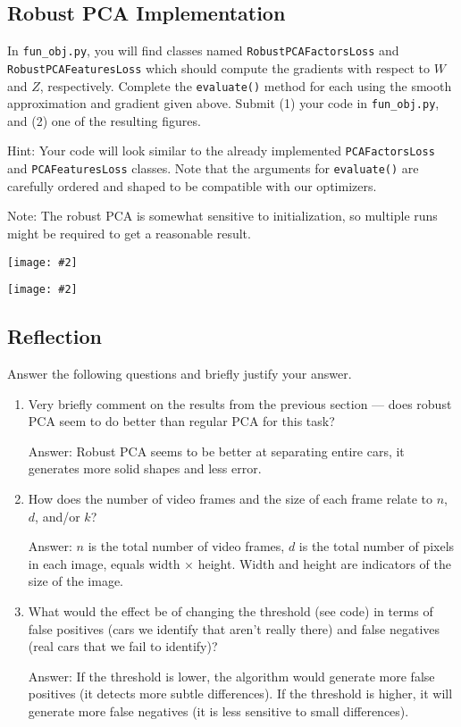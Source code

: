 \documentclass{article}
\newcommand{\blu}[1]{{\textcolor{blu}{#1}}}
\newcommand{\gre}[1]{\textcolor{gre}{#1}}
\newcommand\ans[1]{\par\gre{Answer: #1}}
\let\ask\blu
\newcommand{\centerfig}[2]{\begin{center}\texttt{[image: \#2]}\end{center}}
\begin{document}
\subsection{Robust PCA Implementation}

In \texttt{fun\_obj.py}, you will find classes named \texttt{RobustPCAFactorsLoss} and \texttt{RobustPCAFeaturesLoss} which should compute the gradients with respect to $W$ and $Z$, respectively. \ask{Complete the \texttt{evaluate()} method for each using the smooth approximation and gradient given above. Submit (1) your code in \texttt{fun\_obj.py}, and (2) one of the resulting figures.}

Hint: Your code will look similar to the already implemented \texttt{PCAFactorsLoss} and \texttt{PCAFeaturesLoss} classes. Note that the arguments for \texttt{evaluate()} are carefully ordered and shaped to be compatible with our optimizers.

Note: The robust PCA is somewhat sensitive to initialization, so multiple runs might be required to get a reasonable result.
\centerfig{0.7}{figs/q1.3-code}
\centerfig{0.6}{figs/robustpca_highway_000}

\subsection{Reflection}
\ask{Answer the following questions and briefly justify your answer.}
\begin{enumerate}
	\item Very briefly comment on the results from the previous section --- does robust PCA seem to do better than regular PCA for this task?
 \ans{Robust PCA seems to be better at separating entire cars, it generates more solid shapes and less error.}
	\item How does the number of video frames and the size of each frame relate to $n$, $d$, and/or $k$?
 \ans{$n$ is the total number of video frames, $d$ is the total number of pixels in each image, equals width $\times$ height. Width and height are indicators of the size of the image.}
	\item What would the effect be of changing the threshold (see code) in terms of false positives (cars we identify that aren't really there) and false negatives (real cars that we fail to identify)?
 \ans{If the threshold is lower, the algorithm would generate more false positives (it detects more subtle differences). If the threshold is higher, it will generate more false negatives (it is less sensitive to small differences).}
\end{enumerate}
\end{document}
